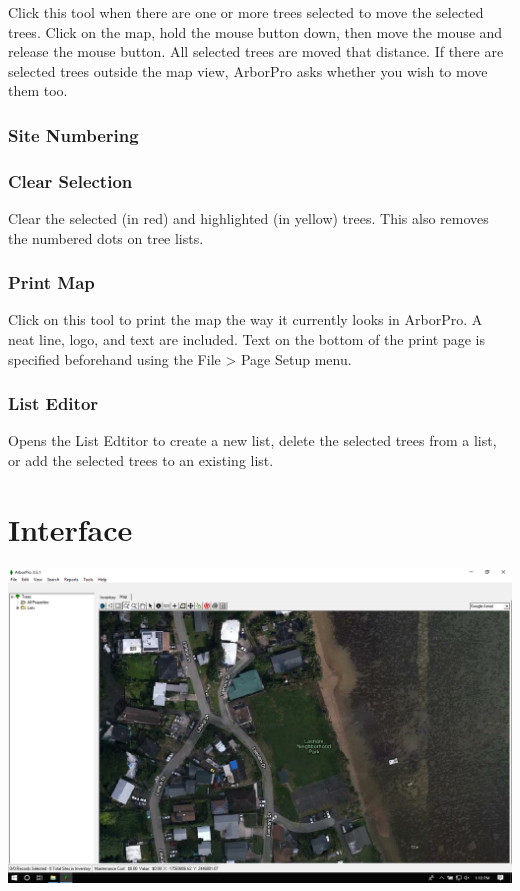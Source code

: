 \documentclass[]{book}
\begin{document}
Click this tool when there are one or more trees selected to move the
selected trees. Click on the map, hold the mouse button down, then move
the mouse and release the mouse button. All selected trees are moved
that distance. If there are selected trees outside the map view,
ArborPro asks whether you wish to move them too.

\hypertarget{site-numbering}{%
\subsection{Site Numbering}\label{site-numbering}}

\hypertarget{clear-selection}{%
\subsection{Clear Selection}\label{clear-selection}}

Clear the selected (in red) and highlighted (in yellow) trees. This also
removes the numbered dots on tree lists.

\hypertarget{print-map}{%
\subsection{Print Map}\label{print-map}}

Click on this tool to print the map the way it currently looks in
ArborPro. A neat line, logo, and text are included. Text on the bottom
of the print page is specified beforehand using the File \textgreater{}
Page Setup menu.

\hypertarget{list-editor}{%
\subsection{List Editor}\label{list-editor}}

Opens the List Edtitor to create a new list, delete the selected trees
from a list, or add the selected trees to an existing list.

\hypertarget{interface}{%
\chapter{Interface}\label{interface}}

\includegraphics[width=40in]{images/interface}
\end{document}

